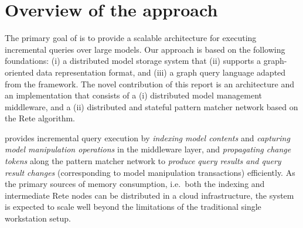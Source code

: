\chapter{Overview of the approach}
\label{chap:overview}

The primary goal of \iqd{} is to provide a scalable architecture for executing incremental queries over large models. Our approach is based on the following foundations: (i) a distributed model storage system that (ii) supports a graph-oriented data representation format, and (iii) a graph query language adapted from the \eiq{} framework. The novel contribution of this report is an architecture and an implementation that consists of a (i) distributed model management middleware, and a (ii) distributed and stateful pattern matcher network based on the Rete algorithm.

\iqd{} provides incremental query execution by \emph{indexing model contents} and \emph{capturing model manipulation operations} in the middleware layer, and \emph{propagating change tokens} along the pattern matcher network to \emph{produce query results and query result changes} (corresponding to model manipulation transactions) efficiently. As the primary sources of memory consumption, i.e.\ both the indexing and intermediate Rete nodes can be distributed in a cloud infrastructure, the system is expected to scale well beyond the limitations of the traditional single workstation setup.













